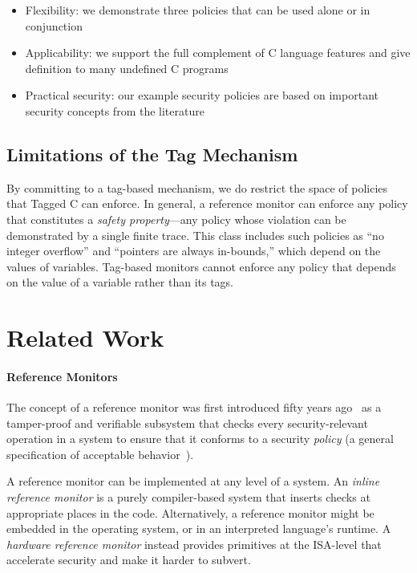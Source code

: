 \documentclass{llncs}
\begin{document}
\begin{table}[t]
[Here we list criteria and evaluate how we fulfilled them]

\begin{itemize}
\item Flexibility: we demonstrate three policies that can be used alone or in conjunction
\item Applicability: we support the full complement of C language features and give definition
  to many undefined C programs
\item Practical security: our example security policies are based on important security concepts
  from the literature
\end{itemize}

\subsection{Limitations of the Tag Mechanism}

By committing to a tag-based mechanism, we do restrict the space of policies that Tagged C
can enforce. In general, a reference monitor can enforce any policy that constitutes a
{\em safety property}---any policy whose violation can be demonstrated by a single finite
trace. This class includes such policies as ``no integer overflow'' and ``pointers are always in-bounds,''
which depend on the values of variables. Tag-based monitors cannot enforce any policy that
depends on the value of a variable rather than its tags.

\section{Related Work}

\paragraph{Reference Monitors}

The concept of a reference monitor was first introduced fifty years ago~\cite{Anderson72:PlanningStudy}
as a tamper-proof and verifiable subsystem that checks every security-relevant operation in a system to
ensure that it conforms to a security {\em policy} (a general specification of acceptable behavior~\cite{Goguen82:SecurityPolicies}).

A reference monitor can be implemented at any level of a system. An {\em inline reference monitor}\cite{??}
is a purely compiler-based system that inserts checks at appropriate places in the code.
Alternatively, a reference monitor might be embedded in the operating system, or in an interpreted
language's runtime. A {\em hardware reference monitor} instead provides primitives at the ISA-level
that accelerate security and make it harder to subvert.


\end{table}
\end{document}
